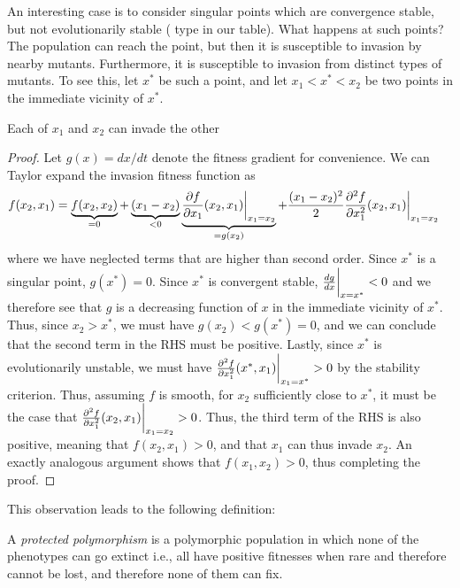 An interesting case is to consider singular points which are convergence stable, but not evolutionarily stable ( type  in our table). 
What happens at such points? 
The population can reach the point, but then it is susceptible to invasion by nearby mutants. Furthermore, it is susceptible to invasion from distinct types of mutants. To see this, let $x^*$ be such a point, and let $x_1 < x^* < x_2$ be two points in the immediate vicinity of $x^*$.
\begin{claim}
	Each of $x_1$ and $x_2$ can invade the other
\end{claim}
\begin{proof}
	Let $g(x) = dx/dt$ denote the fitness gradient for convenience.
	We can Taylor expand the invasion fitness function as
	\begin{align*}
		f(x_2 ,x_1) &= \underbrace{f(x_2 , x_2)}_{=0} + \underbrace{(x_1 - x_2)}_{< 0 }\underbrace{\frac{\partial f}{\partial x_1}(x_2, x_1)\bigg{|}_{x_1 = x_2}}_{=g(x_2)} + \frac{(x_1-x_2)^2}{2} \frac{\partial^2 f}{\partial x_1^2}(x_2 , x_1)\bigg{|}_{x_1 = x_2}
	\end{align*}
	where we have neglected terms that are higher than second order. Since $x^*$ is a singular point, $g(x^*) = 0$. Since $x^*$ is convergent stable, $\frac{d g}{dx}\bigg{|}_{x=x^*} < 0$ and we therefore see that $g$ is a decreasing function of $x$ in the immediate vicinity of $x^*$. Thus, since $x_2 > x^*$, we must have $g(x_2) < g(x^*) = 0$, and we can conclude that the second term in the RHS must be positive. Lastly, since $x^*$ is evolutionarily unstable, we must have $\frac{\partial^2 f}{\partial x_1^2}(x^*,x_1)\bigg{|}_{x_1 = x^*} > 0$ by the stability criterion. Thus, assuming $f$ is smooth, for $x_2$ sufficiently close to $x^*$, it must be the case that $\frac{\partial^2 f}{\partial x_1^2}(x_2,x_1)\bigg{|}_{x_1 = x_2} > 0$. Thus, the third term of the RHS is also positive, meaning that $f(x_2, x_1) > 0$, and that $x_1$ can thus invade $x_2$. An exactly analogous argument shows that $f(x_1,x_2) > 0$, thus completing the proof.
\end{proof}
This observation leads to the following definition:
\begin{definition}
	A \textit{protected polymorphism} is a polymorphic population in which none of the phenotypes can go extinct i.e., all have positive fitnesses when rare and therefore cannot be lost, and therefore none of them can fix. 
\end{definition}


